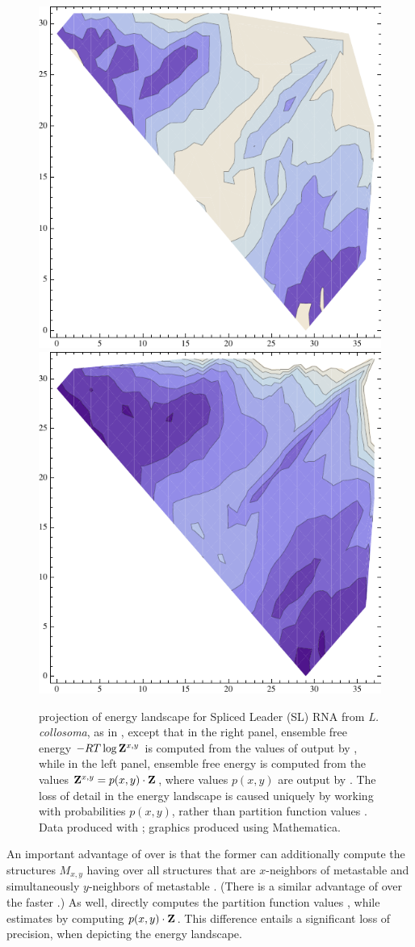\begin{figure}[!ht]
\centering
\includegraphics[width=.45\textwidth]{Figures/FFTbor2D/rtwofoldProbContour.pdf}
\quad
\includegraphics[width=.45\textwidth]{Figures/FFTbor2D/rtwofoldEnsFreeEnergyContour.pdf}
\caption[\twoD projection of energy landscape for Spliced Leader (SL) RNA
from {\em L. collosoma}, as in
,
except that in the right panel, ensemble free energy $-RT \log \bfZ{x,y}{}$
is computed from the values of  output by \rnatwofold,
while in the left panel, ensemble free energy is computed from
the values $\bfZ{x,y}{}=p(x,y) \cdot \fullZ$, where values $p(x,y)$ are output
by \rnatwofold]{
\twoD projection of energy landscape for Spliced Leader (SL) RNA
from {\em L. collosoma}, as in
,
except that in the right panel, ensemble free energy $-RT \log \bfZ{x,y}{}$
is computed from the values of  output by \rnatwofold,
while in the left panel, ensemble free energy is computed from
the values $\bfZ{x,y}{}=p(x,y) \cdot \fullZ$, where values $p(x,y)$ are output
by \rnatwofold.
The loss of detail in the \twoD energy landscape is caused uniquely by
working with probabilities $p(x,y)$, rather than partition function
values .
Data produced with \rnatwofold; graphics produced using Mathematica.
}
\label{fig:ffttwo:rtwofoldProbContour}
\end{figure}

An important advantage of
\rnatwofold over \ffttwo is that the former can additionally
compute the structures $M_{x,y}$ having \mfe over all
structures that are $x$-neighbors of metastable \strA and simultaneously
$y$-neighbors of metastable \strB. (There is a similar advantage of \rnabor
\citep{freyhult.b07} over the faster \fftbor \citep{senter.po12}.)
As well, \rnatwofold directly computes the partition function values
, while \ffttwo estimates  by computing
$p(x,y) \cdot {\bf Z}^{}_{}$. This difference entails a significant loss of precision,
when depicting the energy landscape.
